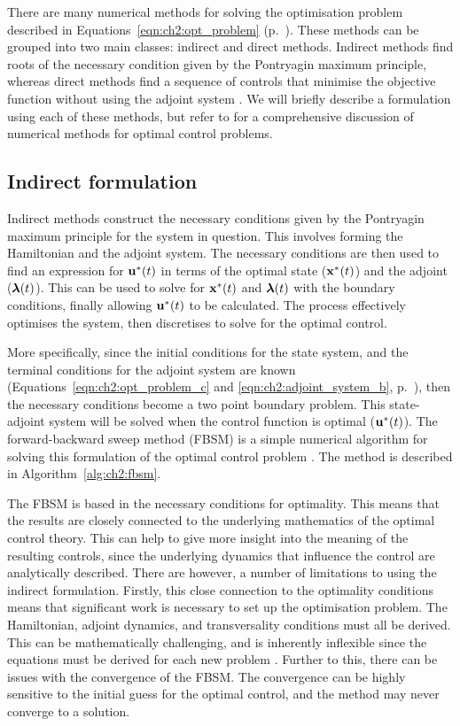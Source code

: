 There are many numerical methods for solving the optimisation problem described in Equations~\ref{eqn:ch2:opt_problem} (p.~\pageref{eqn:ch2:opt_problem}). These methods can be grouped into two main classes: indirect and direct methods. Indirect methods find roots of the necessary condition given by the Pontryagin maximum principle, whereas direct methods find a sequence of controls that minimise the objective function without using the adjoint system \citep{betts_practical_2010}. We will briefly describe a formulation using each of these methods, but refer to \citet{betts_practical_2010} for a comprehensive discussion of numerical methods for optimal control problems.

\subsection{Indirect formulation}

Indirect methods construct the necessary conditions given by the Pontryagin maximum principle for the system in question. This involves forming the Hamiltonian and the adjoint system. The necessary conditions are then used to find an expression for $\mathbf{\bm{u}}^*(t)$ in terms of the optimal state ($\mathbf{\bm{x}}^*(t)$) and the adjoint ($\mathbf{\bm{\lambda}}(t)$). This can be used to solve for $\mathbf{\bm{x}}^*(t)$ and $\mathbf{\bm{\lambda}}(t)$ with the boundary conditions, finally allowing $\mathbf{\bm{u}}^*(t)$ to be calculated. The process effectively optimises the system, then discretises to solve for the optimal control.

More specifically, since the initial conditions for the state system, and the terminal conditions for the adjoint system are known (Equations~\ref{eqn:ch2:opt_problem_c} and \ref{eqn:ch2:adjoint_system_b}, p.~\pageref{eqn:ch2:opt_problem_c}), then the necessary conditions become a two point boundary problem. This state-adjoint system will be solved when the control function is optimal ($\mathbf{\bm{u}}^*(t)$). The forward-backward sweep method (FBSM) is a simple numerical algorithm for solving this formulation of the optimal control problem \citep{lenhart_optimal_2007}. The method is described in Algorithm~\ref{alg:ch2:fbsm}.

The FBSM is based in the necessary conditions for optimality. This means that the results are closely connected to the underlying mathematics of the optimal control theory. This can help to give more insight into the meaning of the resulting controls, since the underlying dynamics that influence the control are analytically described. There are however, a number of limitations to using the indirect formulation. Firstly, this close connection to the optimality conditions means that significant work is necessary to set up the optimisation problem. The Hamiltonian, adjoint dynamics, and transversality conditions must all be derived. This can be mathematically challenging, and is inherently inflexible since the equations must be derived for each new problem \citep{betts_practical_2010}. Further to this, there can be issues with the convergence of the FBSM. The convergence can be highly sensitive to the initial guess for the optimal control, and the method may never converge to a solution.

